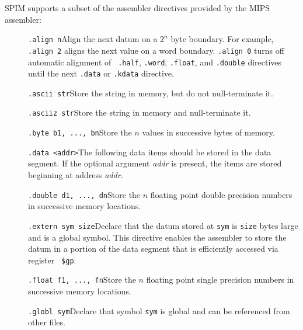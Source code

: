 SPIM supports a subset of the assembler directives provided by the
MIPS assembler:
\begin{description}
  \item [] {\tt .align n}\newline Align the next datum on a $2^n$ byte
boundary.  For example, {\tt .align 2} aligns the next value on a word
boundary.  {\tt .align 0} turns off automatic alignment of {\tt
.half}, {\tt .word}, {\tt .float}, and {\tt .double} directives until
the next {\tt .data} or {\tt .kdata} directive.

  \item [] {\tt .ascii str}\newline Store the string in memory, but do
not null-terminate it.

  \item [] {\tt .asciiz str}\newline Store the string in memory and
null-terminate it.

  \item [] {\tt .byte b1, ..., bn}\newline Store the $n$ values in
successive bytes of memory.

  \item [] {\tt .data <addr>}\newline The following data items should
be stored in the data segment.  If the optional argument {\em addr\/}
is present, the items are stored beginning at address {\em addr\/}.

  \item [] {\tt .double d1, ..., dn}\newline Store the $n$ floating
point double precision numbers in successive memory locations.

  \item [] {\tt .extern sym size}\newline Declare that the datum
stored at {\tt sym} is {\tt size} bytes large and is a global symbol.
This directive enables the assembler to store the datum in a portion
of the data segment that is efficiently accessed via register {\tt
\$gp}.

  \item [] {\tt .float f1, ..., fn}\newline Store the $n$ floating
point single precision numbers in successive memory locations.

  \item [] {\tt .globl sym}\newline Declare that symbol {\tt sym} is
global and can be referenced from other files.


\end{description}
